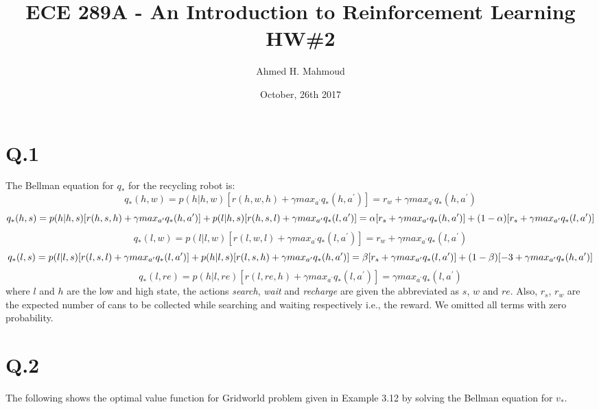 \documentclass[12pt] {article}
\begin{document}
\title{ECE 289A - An Introduction to Reinforcement Learning HW\#2}

\author{Ahmed H. Mahmoud}
\date{October, 26th 2017} 
\maketitle
\section*{Q.1}
The Bellman equation for $q_{*}$ for the recycling robot is:
\begin{equation}
q_{*}(h,w) = p(h|h,w)[r(h,w,h) + \gamma max_{a^\prime} q_{*}(h,a^\prime)] = r_{w} + \gamma max_{a^\prime} q_{*}(h,a^\prime)
\end{equation}
\vline
\begin{equation}
q_{*}(h,s) = p(h|h,s)[r(h,s,h) + \gamma max_{a^\prime} q_{*}(h,a^\prime)] + p(l|h,s)[r(h,s,l) + \gamma max_{a^\prime} q_{*}(l,a^\prime)]\\ = \alpha[r_{s} + \gamma max_{a^\prime} q_{*}(h,a^\prime)] + (1-\alpha) [r_{s} + \gamma max_{a^\prime} q_{*}(l,a^\prime)]
\end{equation}
\vline
\begin{equation}
q_{*}(l,w) = p(l|l,w)[r(l,w,l) + \gamma max_{a^\prime} q_{*}(l,a^\prime)]= r_{w} + \gamma max_{a^\prime} q_{*}(l,a^\prime)
\end{equation}
\vline
\begin{equation}
q_{*}(l,s) = p(l|l,s)[r(l,s,l) + \gamma max_{a^\prime} q_{*}(l,a^\prime)] + p(h|l,s)[r(l,s,h) + \gamma max_{a^\prime} q_{*}(h,a^\prime)] \\
= \beta [r_{s} + \gamma max_{a^\prime} q_{*}(l,a^\prime)] + (1-\beta) [-3 + \gamma max_{a^\prime} q_{*}(h,a^\prime)] 
\end{equation}
\vline
\begin{equation}
q_{*}(l,re) = p(h|l,re)[r(l,re,h) + \gamma max_{a^\prime} q_{*}(l,a^\prime)]= \gamma max_{a^\prime} q_{*}(l,a^\prime)
\end{equation}
where $l$ and $h$ are the low and high state, the actions \emph{search}, \emph{wait} and \emph{recharge} are given the abbreviated as $s$, $w$ and $re$. Also, $r_{s}$, $r_{w}$ are the expected number of cans to be collected while searching and waiting respectively i.e., the reward. We omitted all terms with zero probability. 

\section*{Q.2}
The following shows the optimal value function for Gridworld problem given in Example 3.12 by solving the Bellman equation for $v_{*}$.
\end{document}

